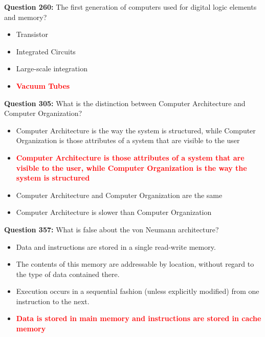 \documentclass[12pt,a4paper]{article}
\begin{document}
\vspace{0.5cm}

\vspace{0.5cm}

\textbf{Question 260:} The first generation of computers used \underline{\hspace{1.5cm}} for digital logic elements and memory?

\begin{itemize}
    \item[\textbf{A.}] Transistor
    \item[\textbf{B.}] Integrated Circuits
    \item[\textbf{C.}] Large-scale integration
    \item[\textbf{D.}] \textcolor{red}{\textbf{Vacuum Tubes}}
\end{itemize}

\vspace{0.5cm}

\vspace{0.5cm}

\textbf{Question 305:} What is the distinction between Computer Architecture and Computer Organization?

\begin{itemize}
    \item[\textbf{A.}] Computer Architecture is the way the system is structured, while Computer Organization is those attributes of a system that are visible to the user
    \item[\textbf{B.}] \textcolor{red}{\textbf{Computer Architecture is those attributes of a system that are visible to the user, while Computer Organization is the way the system is structured}}
    \item[\textbf{C.}] Computer Architecture and Computer Organization are the same
    \item[\textbf{D.}] Computer Architecture is slower than Computer Organization
\end{itemize}

\vspace{0.5cm}

\vspace{0.5cm}

\textbf{Question 357:} What is false about the von Neumann architecture?

\begin{itemize}
    \item[\textbf{A.}] Data and instructions are stored in a single read-write memory.
    \item[\textbf{B.}] The contents of this memory are addressable by location, without regard to the type of data contained there.
    \item[\textbf{C.}] Execution occurs in a sequential fashion (unless explicitly modified) from one instruction to the next.
    \item[\textbf{D.}] \textcolor{red}{\textbf{Data is stored in main memory and instructions are stored in cache memory}}
\end{itemize}
\end{document}
